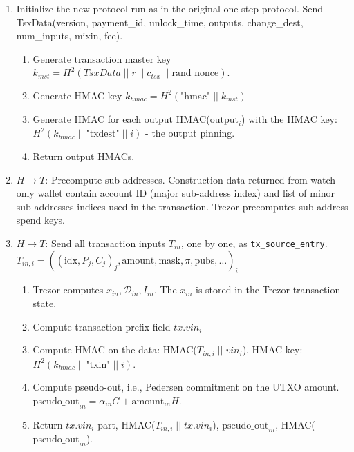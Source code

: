 \documentclass[]{article}
\begin{document}
\begin{enumerate}
	\item Initialize the new protocol run as in the original one-step protocol. Send TsxData(version, payment\_id, unlock\_time, outputs, change\_dest, num\_inputs, mixin, fee).
	\begin{enumerate}
		\item Generate transaction master key $k_{mst} = H^2(TsxData \; || \; r \; || \; c_{tsx} \; || \; \text{rand\_nonce})$.
		
		\item Generate HMAC key $k_{hmac} = H^2\left(\text{"hmac"} \; || \; k_{mst}\right)$

		\item Generate HMAC for each output HMAC($\text{output}_i$) with the HMAC key: $H^2(k_{hmac} \; || \; \text{"txdest"} \; || \; i)$ - the output pinning.
		
		\item Return output HMACs.
	\end{enumerate}
	
	\item $H \rightarrow T$: Precompute sub-addresses. Construction data returned from watch-only wallet contain account ID (major sub-address index) and list of minor sub-addresses indices used in the transaction. Trezor precomputes sub-address spend keys.

	\item $H \rightarrow T$: Send all transaction inputs $T_{in}$, one by one, as \verb|tx_source_entry|.\\
	$T_{in,i} = ((\text{idx}, P_j,C_j)_j, \text{amount}, \text{mask}, \pi, \text{pubs}, \dots)_i$
	\begin{enumerate}
		\item Trezor computes $x_{in}, \mathcal{D}_{in}, I_{in}$. The $x_{in}$ is stored in the Trezor transaction state.
		
		\item Compute transaction prefix field $tx.vin_i$
		
		\item Compute HMAC on the data: HMAC($T_{in,i} \; || \; vin_i$), HMAC key: $H^2(k_{hmac} \; || \; \text{"txin"} \; || \; i)$.
		
		\item Compute pseudo-out, i.e., Pedersen commitment on the UTXO amount. $ \text{pseudo\_out}_{in} = \alpha_{in} G + \text{amount}_{in} H$.
		
		\item Return $tx.vin_i$ part, HMAC($T_{in,i} \; || \; tx.vin_i$), $\text{pseudo\_out}_{in}$, HMAC($\text{pseudo\_out}_{in}$).
	\end{enumerate} 


\end{enumerate}
\end{document}
